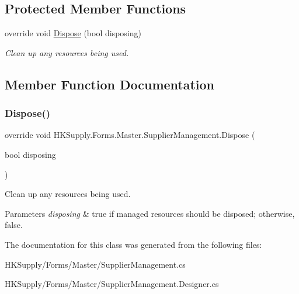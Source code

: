 \subsection*{Protected Member Functions}
\begin{DoxyCompactItemize}
\item 
override void \hyperlink{class_h_k_supply_1_1_forms_1_1_master_1_1_supplier_management_a0f812e9b8d22eda4e3ad8e6a9ad6c553}{Dispose} (bool disposing)
\begin{DoxyCompactList}\small\item\em Clean up any resources being used. \end{DoxyCompactList}\end{DoxyCompactItemize}


\subsection{Member Function Documentation}
\mbox{\label{class_h_k_supply_1_1_forms_1_1_master_1_1_supplier_management_a0f812e9b8d22eda4e3ad8e6a9ad6c553}} 
\subsubsection{\texorpdfstring{Dispose()}{Dispose()}}
{\footnotesize\ttfamily override void H\+K\+Supply.\+Forms.\+Master.\+Supplier\+Management.\+Dispose (\begin{DoxyParamCaption}\item[{bool}]{disposing }\end{DoxyParamCaption})\hspace{0.3cm}{\ttfamily [protected]}}



Clean up any resources being used. 


\begin{DoxyParams}{Parameters}
{\em disposing} & true if managed resources should be disposed; otherwise, false.\\
\hline
\end{DoxyParams}


The documentation for this class was generated from the following files\+:\begin{DoxyCompactItemize}
\item 
H\+K\+Supply/\+Forms/\+Master/Supplier\+Management.\+cs\item 
H\+K\+Supply/\+Forms/\+Master/Supplier\+Management.\+Designer.\+cs\end{DoxyCompactItemize}
